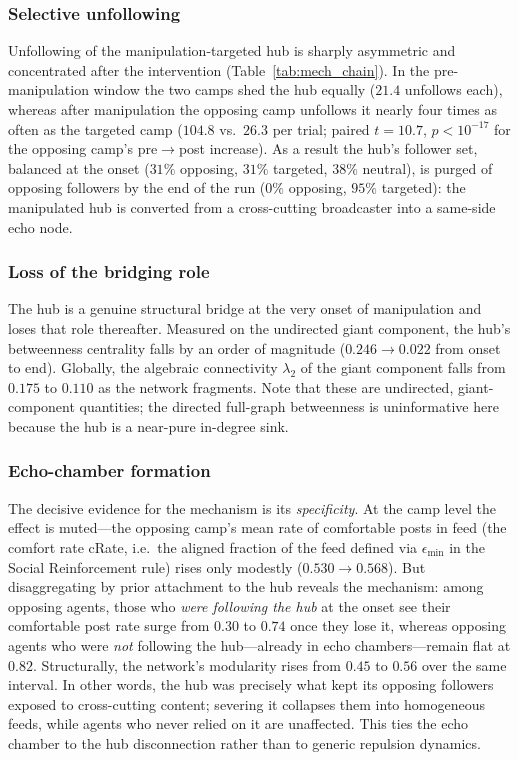 \documentclass[pdflatex,sn-mathphys-num]{sn-jnl}%
\theoremstyle{thmstyleone}%
\theoremstyle{thmstyletwo}%
\theoremstyle{thmstylethree}%
\begin{document}
\subsubsection{Selective unfollowing}
Unfollowing of the manipulation-targeted hub is sharply asymmetric and concentrated after the
intervention (Table~\ref{tab:mech_chain}). In the pre-manipulation window the two
camps shed the hub equally ($21.4$ unfollows each), whereas after manipulation
the opposing camp unfollows it nearly four times as often as the targeted camp
($104.8$ vs.\ $26.3$ per trial; paired $t = 10.7$, $p < 10^{-17}$ for the
opposing camp's pre$\rightarrow$post increase). As a result the hub's follower
set, balanced at the onset ($31\%$ opposing, $31\%$ targeted, $38\%$ neutral),
is purged of opposing followers by the end of the run ($0\%$ opposing, $95\%$
targeted): the manipulated hub is converted from a cross-cutting broadcaster into
a same-side echo node.
\par

\subsubsection{Loss of the bridging role}
The hub is a genuine structural bridge at the very onset of manipulation and loses
that role thereafter. Measured on the undirected giant component, the hub's
betweenness centrality falls by an order of magnitude ($0.246 \rightarrow 0.022$
from onset to end). Globally, the algebraic connectivity $\lambda_2$ of the giant
component falls from $0.175$ to $0.110$ as the network fragments. 
Note that
these are undirected, giant-component quantities; the directed full-graph
betweenness is uninformative here because the hub is a near-pure in-degree sink.
\par

\subsubsection{Echo-chamber formation}\label{Chain3}
The decisive evidence for the mechanism is its \emph{specificity}. At the camp
level the effect is muted---the opposing camp's mean rate of comfortable posts in feed
(the comfort rate cRate, i.e.\ the aligned fraction of the feed defined via $\epsilon_{\min}$ in the Social Reinforcement rule)
rises only modestly ($0.530 \rightarrow 0.568$). But disaggregating by prior
attachment to the hub reveals the mechanism: among opposing agents, those who
\emph{were following the hub} at the onset see their comfortable post rate surge from
$0.30$ to $0.74$ once they lose it, whereas opposing agents who were
\emph{not} following the hub---already in echo chambers---remain flat at $0.82$.
Structurally, the network's modularity rises from
$0.45$ to $0.56$ over the same interval. In other words, the hub was precisely
what kept its opposing followers exposed to cross-cutting content; severing it
collapses them into homogeneous feeds, while agents who never relied on it are
unaffected. This ties the echo chamber to the hub disconnection rather than to
generic repulsion dynamics.
\par
\end{document}
